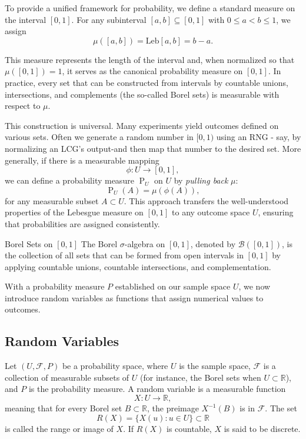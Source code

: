\documentclass[11pt, headings=standardclasses, parskip=half, twoside]{scrartcl}
\begin{document}
To provide a unified framework for probability, we define a standard measure on the interval $[0,1]$. 
For any subinterval $[a, b] \subseteq[0,1]$ with $0 \leq a<b \leq 1$, we assign
\[
\mu([a, b]) = \text{Leb}[a, b] = b - a .
\]

This measure represents the length of the interval and, when normalized so that $\mu([0,1])=1$, it serves as the canonical probability measure on $[0,1]$. 
In practice, every set that can be constructed from intervals by countable unions, intersections, and complements (the so-called Borel sets) is measurable with respect to $\mu$.

This construction is universal. Many experiments yield outcomes defined on various sets.
Often we generate a random number in $[0,1)$ using an RNG - say, by normalizing an LCG's output-and then map that number to the desired set. 
More generally, if there is a measurable mapping
\[
\phi: U \rightarrow[0,1],
\]
we can define a probability measure $\operatorname{P}_{U}$ on $U$ by \textit{pulling back} $\mu$:
\[
\operatorname{P}_{U}(A)=\mu(\phi(A)),
\]
for any measurable subset $A \subset U$. 
This approach transfers the well-understood properties of the Lebesgue measure on $[0,1]$ to any outcome space $U$, ensuring that probabilities are assigned consistently.

\begin{definition}{Borel Sets on $[0,1]$}{}
The Borel $\sigma$-algebra on $[0,1]$, denoted by $\mathcal{B}([0,1])$, is the collection of all sets that can be formed from open intervals in $[0,1]$ by applying countable unions, countable intersections, and complementation.
\end{definition}

With a probability measure $P$ established on our sample space $U$, we now introduce random variables as functions that assign numerical values to outcomes.


\subsection{Random Variables}

\begin{definition}{}
    Let $(U, \mathcal{F}, P)$ be a probability space, where $U$ is the sample space, $\mathcal{F}$ is a collection of measurable subsets of $U$ (for instance, the Borel sets when $U \subset \mathbb{R}$), and $P$ is the probability measure. 
    A random variable is a measurable function
    \[
    X: U \rightarrow \mathbb{R},
    \]
    meaning that for every Borel set $B \subset \mathbb{R}$, the preimage $X^{-1}(B)$ is in $\mathcal{F}$.
    The set
    \[
    R(X)=\{X(u): u \in U\} \subset \mathbb{R}
    \]
    is called the range or image of $X$.
    If $R(X)$ is countable, $X$ is said to be discrete.
\end{definition}
\end{document}
